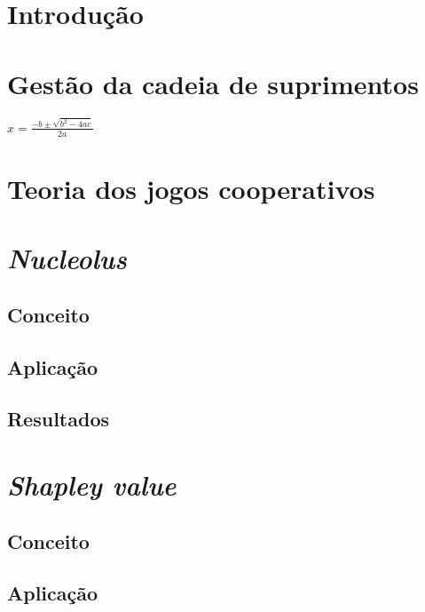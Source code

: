 \documentclass[
	article,			        %
	11pt,				          %
	oneside,			        %
	a4paper,			        %
	english,			        %
	brazil,				        %
	sumario=tradicional
]{abntex2}\usepackage[]{graphicx}\usepackage[]{color}
\begin{document}
\section*{Introdução}


\section{Gestão da cadeia de suprimentos}
$x = \frac{-b \pm \sqrt{b^2 - 4ac}}{2a}$
\section{Teoria dos jogos cooperativos}

\section{\emph{Nucleolus}}

\subsection{Conceito}

\subsection{Aplicação}

\subsection{Resultados}

\section{\emph{Shapley value}}

\subsection{Conceito}

\subsection{Aplicação}
\end{document}
